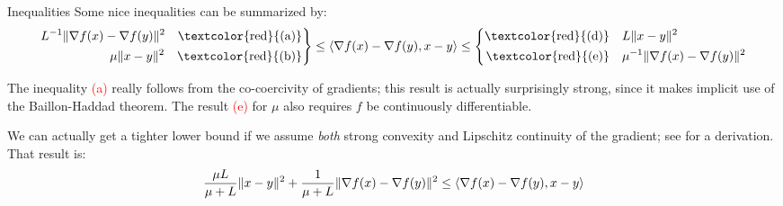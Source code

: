 \documentclass[10pt,handout]{beamer}
\begin{document}
\begin{frame}{Inequalities}
Some nice inequalities can be summarized by: 
{\footnotesize 
\begin{equation} \label{eq:big}
    \left.\begin{aligned}
        L^{-1} \| \nabla f(x) - \nabla f(y) \|^2  \quad\text{\textcolor{red}{(a)}} \\
        \mu \|x-y\|^2 
        \quad\text{\textcolor{red}{(b)}} \\
    \end{aligned} \right\rbrace
    \le \< \nabla f(x) - \nabla f(y), x-y \> 
    \le 
    \left\lbrace\begin{aligned}
        \text{\textcolor{red}{(d)}} \quad& L \|x-y\|^2  \\
        \text{\textcolor{red}{(e)}} \quad& \mu^{-1}  \| \nabla f(x) - \nabla f(y) \|^2
    \end{aligned} \right.
\end{equation}
}

The inequality {\small\textcolor{red}{(a)}} %
really follows from the co-coercivity of gradients; this result is actually surprisingly strong, since it makes implicit use of the Baillon-Haddad theorem. The result {\small\textcolor{red}{(e)}} for $\mu$ also requires $f$ be continuously differentiable. 

\medskip
We can actually get a tighter lower bound if we assume \emph{both} strong convexity and Lipschitz continuity of the gradient; see \cite[Thm. 2.1.12]{Nesterov_2004} for a derivation. That result is:
\[
\frac{\mu L}{\mu + L} \|x-y\|^2  + \frac{1}{\mu+L}\| \nabla f(x) - \nabla f(y) \|^2
\le \langle \nabla f(x) - \nabla f(y), x-y \rangle 
\]




\end{frame}
\end{document}

